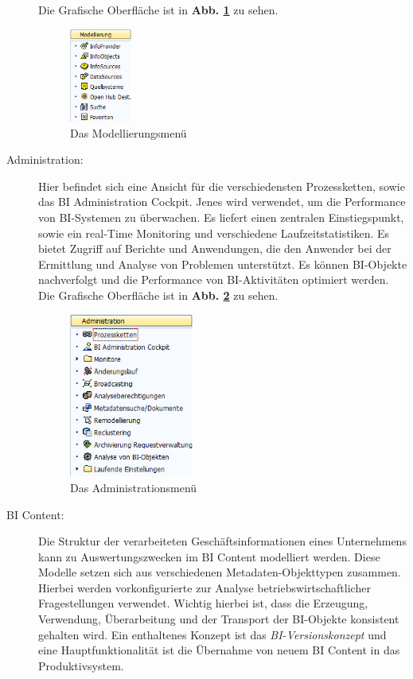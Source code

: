 \begin{description}
\begin{itemize}
\end{itemize}
Die Grafische Oberfläche ist in  \textbf{Abb. \ref{pic:Modellierung}}  zu sehen.
\begin{figure}[H]
    \centering
    \includegraphics[width=0.2\textwidth]{files/Modellierung}
    \caption{Das Modellierungsmenü}
    \label{pic:Modellierung}
\end{figure}
\item[Administration:] Hier befindet sich eine Ansicht für die verschiedensten Prozessketten, sowie das BI Administration Cockpit. Jenes wird verwendet, um die Performance von BI-Systemen zu überwachen. Es liefert einen zentralen Einstiegspunkt, sowie ein real-Time Monitoring und verschiedene Laufzeitstatistiken. Es bietet Zugriff auf Berichte und Anwendungen, die den Anwender bei der Ermittlung und Analyse von Problemen unterstützt. Es können BI-Objekte nachverfolgt und die Performance von BI-Aktivitäten optimiert werden.
Die Grafische Oberfläche ist in  \textbf{Abb. \ref{pic:Administration}}  zu sehen.
\begin{figure}[H]
    \centering
    \includegraphics[width=0.4\textwidth]{files/Administration}
    \caption{Das Administrationsmenü}
    \label{pic:Administration}
\end{figure}
\item[BI Content:] Die Struktur der verarbeiteten Geschäftsinformationen eines Unternehmens kann zu Auswertungszwecken im BI Content modelliert werden. Diese Modelle setzen sich aus verschiedenen Metadaten-Objekttypen zusammen. Hierbei werden vorkonfigurierte zur Analyse betriebswirtschaftlicher Fragestellungen verwendet. Wichtig hierbei ist, dass die Erzeugung, Verwendung, Überarbeitung und der Transport der BI-Objekte konsistent gehalten wird. Ein enthaltenes Konzept ist das \textit{BI-Versionskonzept} und eine Hauptfunktionalität ist die Übernahme von neuem BI Content in das Produktivsystem.

\end{description}
